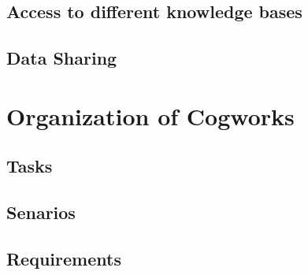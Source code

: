 \subsection{Access to different knowledge bases}

\subsection{Data Sharing}

\section {Organization of Cogworks}

\subsection{Tasks}

\subsection{Senarios}

\subsection {Requirements}
